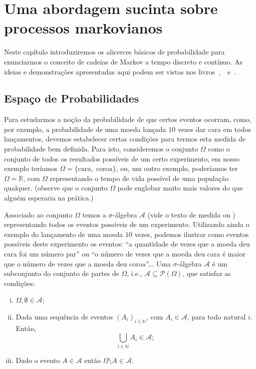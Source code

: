 \documentclass[twoside,openright,titlepage,numbers=noenddot,headinclude,  lineheaders footinclude=true,cleardoublepage=empty,
                                BCOR=5mm,paper=a4,fontsize=12pt ]{scrbook}
\theoremstyle{definition}
\begin{document}

\chapter{Uma abordagem sucinta sobre processos markovianos}
Neste capítulo introduziremos os alicerces básicos de probabilidade
para enunciarmos o conceito de cadeias de Markov a tempo discreto e contínuo.
As ideias e demonstrações apresentadas aqui podem ser vistas nos 
\mbox{livros \cite{barry}, \cite{feller} e \cite{durret1}}.

\section{Espa\c{c}o de Probabilidades}
Para estudarmos a noção da probabilidade de que certos eventos ocorram, como,
por exemplo, a probabilidade de uma moeda lançada $10$ vezes dar cara em todos
lançamentos, devemos estabelecer certas condições para termos esta medida de probabilidade
bem definida. Para isto, consideremos o conjunto $\Omega$ como o conjunto de todos os
resultados possíveis de um certo experimento, em nosso exemplo teríamos $\Omega
= \{ \text{cara}, \text{ coroa} \}$, 
ou, um outro exemplo, poderíamos ter $\Omega = \mathbb{R}$, com $\Omega$ representando o tempo de vida possível
de uma população qualquer. (observe que o conjunto $\Omega$ pode englobar muito mais valores do que alguém
esperaria na prática.)

Associado ao conjunto $\Omega$ temos a $\sigma$-álgebra $\mathscr{A}$ (vide o texto de medida \cite{fernandez} ou \cite{isnard})
 representando todos os eventos possíveis de um experimento. Utilizando ainda
o exemplo do lançamento de uma moeda $10$ vezes, podemos ilustrar como eventos possíveis deste
experimento os eventos: ``a quantidade de vezes que a moeda deu cara foi um número par'' ou
``o número de vezes que a moeda deu cara é maior que o número de vezes que a moeda deu
coroa''... Uma $\sigma$-álgebra $\mathscr{A}$ é um subconjunto do conjunto 
de partes de $\Omega$, i.e., $\mathscr{A} \subseteq \mathscr{P}(\Omega)$, que satisfaz as condições:
\begin{enumerate}[(i)]
\item $\Omega, \emptyset \in \mathscr{A}$;
\item Dada uma sequência de eventos $(A_i)_{i \in \mathbb{N}}$, com $A_i \in \mathscr{A}$,
para todo natural $i$. Então, 
\[
\bigcup_{i \in \mathbb{N}} A_i \in \mathscr{A};
\]
\item Dado o evento $A \in \mathscr{A}$ então $\Omega \setminus A \in \mathscr{A}$.
\end{enumerate}
\end{document}
